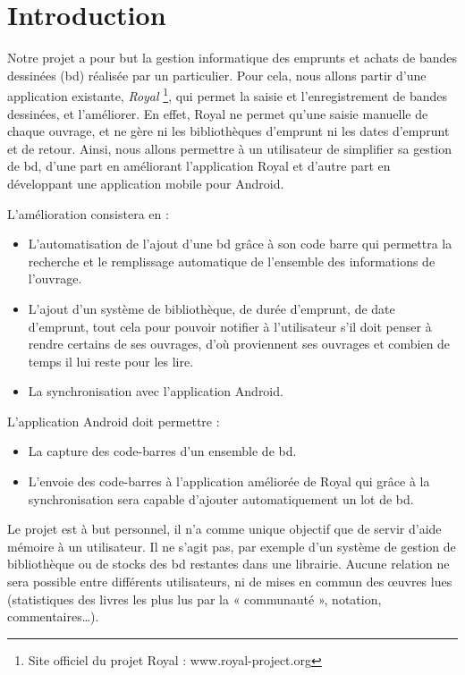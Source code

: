 \part*{Introduction}
Notre projet a pour but la gestion informatique des emprunts et achats de bandes dessinées (bd) réalisée par un particulier.
Pour cela, nous allons partir d'une application existante, \emph{Royal}
\footnote{Site officiel du projet Royal : www.royal-project.org}, qui permet la saisie et l'enregistrement de bandes dessinées, et l'améliorer.
En effet, Royal ne permet qu'une saisie manuelle de chaque ouvrage, et ne gère ni les bibliothèques d'emprunt ni les dates d'emprunt et de retour. Ainsi, nous allons permettre à un utilisateur de simplifier sa gestion de bd, d'une part en améliorant l'application Royal et d'autre part en développant une application mobile pour Android.

L'amélioration consistera en :
\begin{itemize}
\item L'automatisation de l'ajout d'une bd grâce à son code barre qui permettra la recherche et le remplissage automatique de l'ensemble des informations de l'ouvrage.
\item L'ajout d'un système de bibliothèque, de durée d'emprunt, de date d'emprunt, tout cela pour pouvoir notifier à l'utilisateur s'il doit penser à rendre certains de ses ouvrages, d'où proviennent ses ouvrages et combien de temps il lui reste pour les lire.
\item La synchronisation avec l'application Android.
\end{itemize}

L'application Android doit permettre :
\begin{itemize}
\item La capture des code-barres d'un ensemble de bd.
\item L'envoie des code-barres à l'application améliorée de Royal qui grâce à la synchronisation sera capable d'ajouter automatiquement un lot de bd.
\end{itemize}

Le projet est à but personnel, il n'a comme unique objectif que de servir d'aide mémoire à un utilisateur.
Il ne s'agit pas, par exemple d'un système de gestion de bibliothèque ou de stocks des bd restantes dans une librairie.
Aucune relation ne sera possible entre différents utilisateurs, ni de mises en commun des œuvres lues
(statistiques des livres les plus lus par la « communauté », notation, commentaires…).


